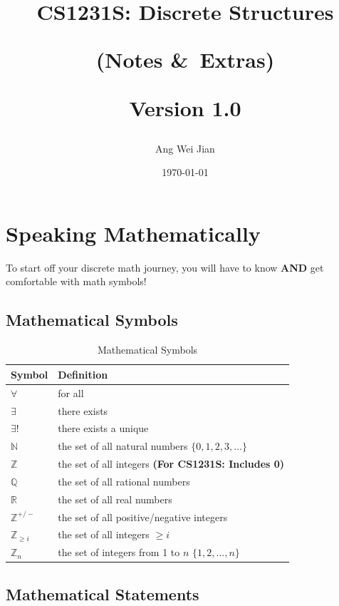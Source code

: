 \documentclass{article}
\title{CS1231S: Discrete Structures

(Notes \&\ Extras)

Version 1.0}
\author{Ang Wei Jian}
\date{\today}
\theoremstyle{plain}
\theoremstyle{definition}
\theoremstyle{remark}
\begin{document}
\maketitle \newpage

\tableofcontents \newpage

\section{Speaking Mathematically}
To start off your discrete math journey, you will have to know \textbf{AND} get comfortable with math symbols!

\subsection{Mathematical Symbols}

\begin{table}[H]
    \centering
    \begin{tabular}{ll}
        \toprule
        \textbf{Symbol} & \textbf{Definition} \\
        \midrule
        $\forall$ & for all \\
        $\exists$ & there exists \\
        $\exists!$ & there exists a unique \\
        $\mathbb{N}$ & the set of all natural numbers $\{0,1,2,3, \dots\}$ \\
        $\mathbb{Z}$ & the set of all integers \textbf{(For CS1231S: Includes 0)} \\
        $\mathbb{Q}$ & the set of all rational numbers \\
        $\mathbb{R}$ & the set of all real numbers \\
        $\mathbb{Z}^{+/-}$ & the set of all positive/negative integers \\
        $\mathbb{Z}_{\geq i}$ & the set of all integers $\geq i$ \\
        $\mathbb{Z}_n$ & the set of integers from 1 to $n$ $\{1,2, \dots, n\}$ \\
        \bottomrule
    \end{tabular}
    \caption{Mathematical Symbols}
    \label{tab:symbols}
\end{table}

\subsection{Mathematical Statements}
\end{document}
